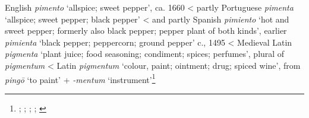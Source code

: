 \begin{etymology}\label{ety:pimento}
English \textit{pimento} `allspice; sweet pepper', ca. 1660
< partly Portuguese \textit{pimenta} `allspice; sweet pepper; black pepper'
< and partly Spanish \textit{pimiento} `hot and sweet pepper; formerly also black pepper; pepper plant of both kinds', earlier \textit{pimienta} `black pepper; peppercorn; ground pepper'  c., 1495
< Medieval Latin \textit{pigmenta} `plant juice; food seasoning; condiment; spices; perfumes', plural of \textit{pigmentum}
< Latin \textit{pigmentum} `colour, paint; ointment; drug; spiced wine', from \textit{pingō} `to paint' + \textit{-mentum} `instrument'\footnote{\textcite[pimento]{oed}; \textcite[pimento]{oed}; \textcite[pimiento]{oed}; \textcites[415]{gomez_de_silva_elseviers_1985}[495]{corominas_breve_1987}; \textcite[pigmentum]{lewis_latin_1879}}
\end{etymology}